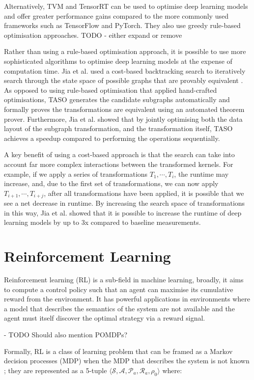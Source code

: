 Alternatively, TVM and TensorRT can be used to optimise deep learning models and offer greater performance gains compared to the more commonly used frameworks such as TensorFlow and PyTorch. They also use greedy rule-based optimisation approaches. TODO - either expand or remove

Rather than using a rule-based optimisation approach, it is possible to use more sophisticated algorithms to optimise deep learning models at the expense of computation time. Jia et al. used a cost-based backtracking search to iteratively search through the state space of possible graphs that are provably equivalent \cite{jia2019taso}. As opposed to using rule-based optimisation that applied hand-crafted optimisations, TASO generates the candidate subgraphs automatically and formally proves the transformations are equivalent using an automated theorem prover. Furthermore, Jia et al. showed that by jointly optimising both the data layout of the subgraph transformation, and the transformation itself, TASO achieves a speedup compared to performing the operations sequentially.

A key benefit of using a cost-based approach is that the search can take into account far more complex interactions between the transformed kernels. For example, if we apply a series of transformations $T_1, \cdots, T_i$, the runtime may increase, and, due to the first set of transformations, we can now apply $T_{i + 1}, \cdots, T_{i + j}$, after all transformations have been applied, it is possible that we see a net decrease in runtime. By increasing the search space of transformations in this way, Jia et al. showed that it is possible to increase the runtime of deep learning models by up to 3x \cite{jia2019taso, jia2019optimizing} compared to baseline measurements.


\section{Reinforcement Learning}
Reinforcement learning (RL) is a sub-field in machine learning, broadly, it aims to compute a control policy such that an agent can maximise its cumulative reward from the environment. It has powerful applications in environments where a model that describes the semantics of the system are not available and the agent must itself discover the optimal strategy via a reward signal.

- TODO Should also mention POMDPs?

Formally, RL is a class of learning problem that can be framed as a Markov decision processes (MDP) when the MDP that describes the system is not known \cite{bellman1957}; they are represented as a 5-tuple $\langle \mathcal{S}, \mathcal{A}, \mathcal{P}_a, \mathcal{R}_a, \rho_0 \rangle$ where:

